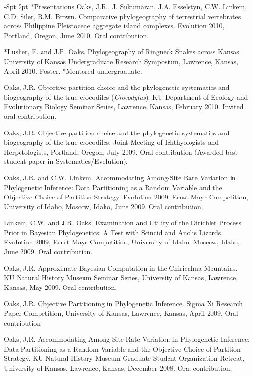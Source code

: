 \documentclass[10pt]{article}
\makeatletter
\renewcommand{\section}{\@startsection{section}{1}{0mm}%
    {-8pt}%
    {2pt}%
   {\bfseries\large}}
\makeatother
\begin{document}
\section*{Presentations}
\hangindent=5mm
Oaks, J.R., J. Sukumaran, J.A. Esselstyn, C.W. Linkem, C.D. Siler, R.M. Brown.
Comparative phylogeography of terrestrial vertebrates across Philippine Pleistocene aggregate island complexes.
Evolution 2010, Portland, Oregon, June 2010.
Oral contribution.

\hangindent=5mm
*Lusher, E. and J.R. Oaks.
Phylogeography of Ringneck Snakes across Kansas.
University of Kansas Undergraduate Research Symposium, Lawrence, Kansas, April 2010.
Poster.
*Mentored undergraduate.

\hangindent=5mm
Oaks, J.R.
Objective partition choice and the phylogenetic systematics and biogeography of the true crocodiles (\emph{Crocodylus}).
KU Department of Ecology and Evolutionary Biology Seminar Series, Lawrence, Kansas, February 2010.
Invited oral contribution.

\hangindent=5mm
Oaks, J.R.
Objective partition choice and the phylogenetic systematics and biogeography of the true crocodiles.
Joint Meeting of Ichthyologists and Herpetologists, Portland, Oregon, July 2009.
Oral contribution (Awarded best student paper in Systematics/Evolution).

\hangindent=5mm
Oaks, J.R. and C.W. Linkem.
Accommodating Among-Site Rate Variation in Phylogenetic Inference: Data Partitioning as a Random Variable and the Objective Choice of Partition Strategy.
Evolution 2009, Ernst Mayr Competition, University of Idaho, Moscow, Idaho, June 2009.
Oral contribution.

\hangindent=5mm
Linkem, C.W. and J.R. Oaks.
Examination and Utility of the Dirichlet Process Prior in Bayesian Phylogenetics: A Test with Scincid and Anolis Lizards.
Evolution 2009, Ernst Mayr Competition, University of Idaho, Moscow, Idaho, June 2009.
Oral contribution.

\hangindent=5mm
Oaks, J.R.
Approximate Bayesian Computation in the Chiricahua Mountains.
KU Natural History Museum Seminar Series, University of Kansas, Lawrence, Kansas, May 2009.
Oral contribution.

\hangindent=5mm
Oaks, J.R.
Objective Partitioning in Phylogenetic Inference.
Sigma Xi Research Paper Competition, University of Kansas, Lawrence, Kansas, April 2009.
Oral contribution

\hangindent=5mm
Oaks, J.R.
Accommodating Among-Site Rate Variation in Phylogenetic Inference: Data Partitioning as a Random Variable and the Objective Choice of Partition Strategy.
KU Natural History Museum Graduate Student Organization Retreat, University of Kansas, Lawrence, Kansas, December 2008.
Oral contribution.
\end{document}

